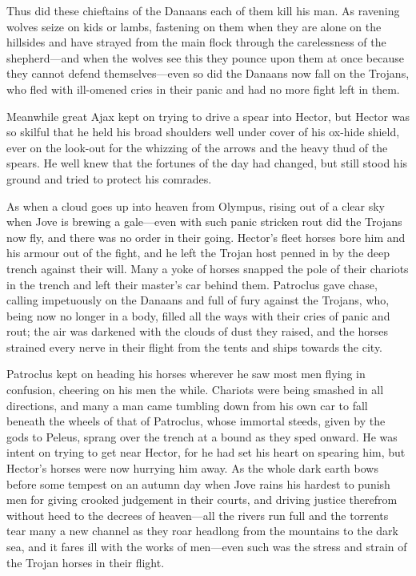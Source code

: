 Thus did these chieftains of the Danaans each of them kill his man. As
ravening wolves seize on kids or lambs, fastening on them when they are
alone on the hillsides and have strayed from the main flock through the
carelessness of the shepherd—and when the wolves see this they
pounce upon them at once because they cannot defend themselves—even
so did the Danaans now fall on the Trojans, who fled with ill-omened cries
in their panic and had no more fight left in them.

Meanwhile great Ajax kept on trying to drive a spear into Hector, but
Hector was so skilful that he held his broad shoulders well under cover of
his ox-hide shield, ever on the look-out for the whizzing of the arrows
and the heavy thud of the spears. He well knew that the fortunes of the
day had changed, but still stood his ground and tried to protect his
comrades.

As when a cloud goes up into heaven from Olympus, rising out of a clear
sky when Jove is brewing a gale—even with such panic stricken rout
did the Trojans now fly, and there was no order in their going. Hector’s
fleet horses bore him and his armour out of the fight, and he left the
Trojan host penned in by the deep trench against their will. Many a yoke
of horses snapped the pole of their chariots in the trench and left their
master’s car behind them. Patroclus gave chase, calling impetuously on the
Danaans and full of fury against the Trojans, who, being now no longer in
a body, filled all the ways with their cries of panic and rout; the air
was darkened with the clouds of dust they raised, and the horses strained
every nerve in their flight from the tents and ships towards the city.

Patroclus kept on heading his horses wherever he saw most men flying in
confusion, cheering on his men the while. Chariots were being smashed in
all directions, and many a man came tumbling down from his own car to fall
beneath the wheels of that of Patroclus, whose immortal steeds, given by
the gods to Peleus, sprang over the trench at a bound as they sped onward.
He was intent on trying to get near Hector, for he had set his heart on
spearing him, but Hector’s horses were now hurrying him away. As the whole
dark earth bows before some tempest on an autumn day when Jove rains his
hardest to punish men for giving crooked judgement in their courts, and
driving justice therefrom without heed to the decrees of heaven—all
the rivers run full and the torrents tear many a new channel as they roar
headlong from the mountains to the dark sea, and it fares ill with the
works of men—even such was the stress and strain of the Trojan
horses in their flight.

